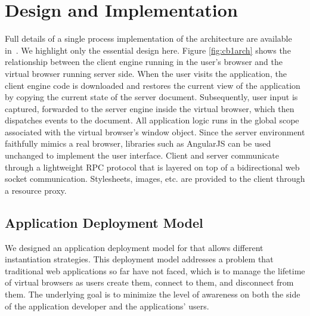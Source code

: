 \section{Design and Implementation}
\label{sec:implementation}

Full details of a single process implementation of the \cb architecture
are available in~\cite{mcdaniel2012cloudbrowser}.  
We highlight only the
essential design here.  Figure \ref{fig:cb1arch} shows the relationship 
between the client engine running in the user's browser and the virtual browser
running server side.  When the user visits the application, the client engine
code is downloaded and restores the current view of the application by
copying the current state of the server document.  Subsequently, user input 
is captured, forwarded to the server engine inside the virtual browser, 
which then dispatches events to the document.  All application logic runs
in the global scope associated with the virtual browser's window object.
Since the server environment faithfully mimics a real browser, libraries
such as AngularJS can be used unchanged to implement the user interface.
Client and server communicate through a lightweight RPC protocol that is 
layered on top of a bidirectional web socket communication. 
Stylesheets, images, etc. are provided to the client through a resource
proxy.

\subsection{Application Deployment Model}
\label{sec:appmodel}

We designed an application deployment model for \cbtwo{} that allows different
instantiation strategies.  This deployment model addresses a problem that traditional
web applications so far have not faced, which is to manage the lifetime of virtual
browsers as users create them, connect to them, and disconnect from them.
The underlying goal is to minimize the level of awareness on both the side
of the application developer and the applications' users.

